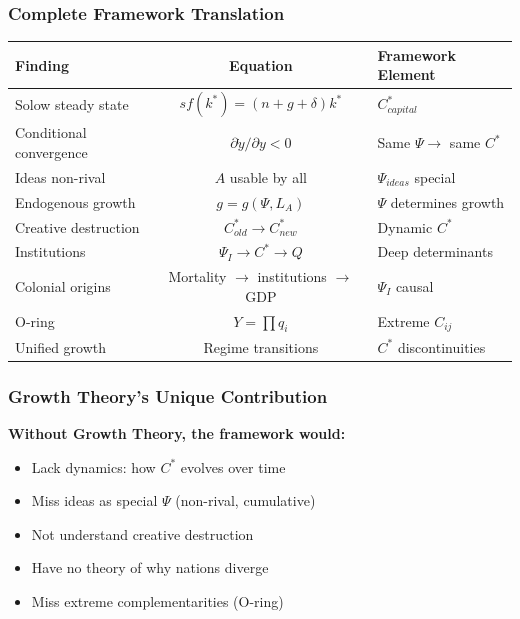 \subsubsection{Complete Framework Translation}

\begin{center}
\renewcommand{\arraystretch}{1.5}
\begin{tabular}{|l|c|l|}
\hline
\textbf{Finding} & \textbf{Equation} & \textbf{Framework Element} \\
\hline
Solow steady state & $sf(k^*) = (n+g+\delta)k^*$ & $C^*_{capital}$ \\
\hline
Conditional convergence & $\partial \dot{y}/\partial y < 0$ & Same $\Psi \to$ same $C^*$ \\
\hline
Ideas non-rival & $A$ usable by all & $\Psi_{ideas}$ special \\
\hline
Endogenous growth & $g = g(\Psi, L_A)$ & $\Psi$ determines growth \\
\hline
Creative destruction & $C^*_{old} \to C^*_{new}$ & Dynamic $C^*$ \\
\hline
Institutions & $\Psi_I \to C^* \to Q$ & Deep determinants \\
\hline
Colonial origins & Mortality $\to$ institutions $\to$ GDP & $\Psi_I$ causal \\
\hline
O-ring & $Y = \prod q_i$ & Extreme $C_{ij}$ \\
\hline
Unified growth & Regime transitions & $C^*$ discontinuities \\
\hline
\end{tabular}
\end{center}

\subsubsection{Growth Theory's Unique Contribution}

\textbf{Without Growth Theory, the framework would:}
\begin{itemize}
    \item Lack dynamics: how $C^*$ evolves over time
    \item Miss ideas as special $\Psi$ (non-rival, cumulative)
    \item Not understand creative destruction
    \item Have no theory of why nations diverge
    \item Miss extreme complementarities (O-ring)
\end{itemize}

